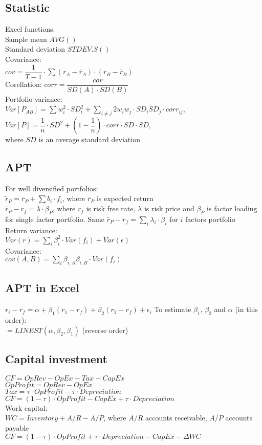 \subsection*{Statistic}
Excel functions: \\
Sample mean $AVG()$ \\ 
Standard deviation $STDEV.S()$ \\
Covariance: \\ $cov = \dfrac{1}{T-1}\cdot \sum (r_A - \bar{r}_A)\cdot(r_B-\bar{r}_B)$ \\
Corellation: $corr = \dfrac{cov}{SD(A)\cdot SD(B)}$\\
Portfolio variance: \\
$Var[P_{AB}] = \sum w_i^2 \cdot SD_i^2 + \sum_{i\neq j} 2w_iw_j \cdot SD_iSD_j \cdot corr_{ij}$, \\
$Var[P] = \dfrac{1}{n}\cdot SD^2 + \left(1-\dfrac{1}{n}\right)\cdot corr\cdot SD \cdot SD$, \\
where $SD$ is an average standard deviation
\subsection*{APT}
For well diversified portfolios: \\
$\widetilde{r}_P = \bar{r}_P + \sum b_i\cdot f_i$, where $\bar{r}_P$ is expected return\\
$\bar{r}_P - r_f = \lambda\cdot\beta_P$, where $r_f$ is risk free rate, $\lambda$ is risk price and $\beta_P$ is factor loading for single factor portfolio.
Same $\bar{r}_P - r_f = \sum_i \lambda_i\cdot\beta_i$ for $i$ factors portfolio\\
Return variance:\\
$Var(r) = \sum_i \beta_i^2\cdot Var(f_i) + Var(\epsilon)$\\
Covariance: \\
$cov(A,B) = \sum_i\beta_{i,A}\beta_{i,B}\cdot Var(f_i)$
\subsection*{APT in Excel}
$r_i - r_f = \alpha + \beta_1(r_1-r_f) + \beta_2(r_2 - r_f) + \epsilon_i$
To estimate $\beta_1$, $\beta_2$ and $\alpha$ (in this order): \\
$=LINEST(\alpha, \beta_2, \beta_1)$ (reverse order)
\subsection*{Capital investment}
$CF = OpRev - OpEx - Tax - CapEx$\\
$OpProfit = OpRev - OpEx$ \\
$Tax = \tau\cdot OpProfit - \tau\cdot Depreciation$ \\
$CF = (1-\tau)\cdot OpProfit - CapEx + \tau \cdot Depreciation$ \\
Work capital:\\
$WC = Inventory + A/R - A/P$, where $A/R$ accounts receivable, $A/P$ accounts payable\\
$CF = (1-\tau)\cdot OpProfit + \tau\cdot Depreciation - CapEx - \Delta WC$
